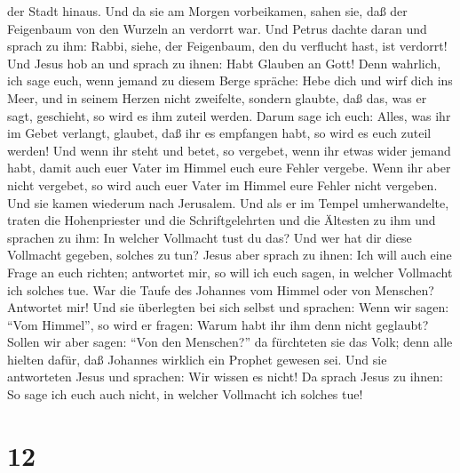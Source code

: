 der Stadt hinaus.  Und da sie am Morgen vorbeikamen,
sahen sie, daß der Feigenbaum von den Wurzeln an verdorrt war.
 Und Petrus dachte daran und sprach zu ihm: Rabbi, siehe,
der Feigenbaum, den du verflucht hast, ist verdorrt!  Und
Jesus hob an und sprach zu ihnen: Habt Glauben an Gott! 
Denn wahrlich, ich sage euch, wenn jemand zu diesem Berge spräche: Hebe
dich und wirf dich ins Meer, und in seinem Herzen nicht zweifelte,
sondern glaubte, daß das, was er sagt, geschieht, so wird es ihm zuteil
werden.  Darum sage ich euch: Alles, was ihr im Gebet
verlangt, glaubet, daß ihr es empfangen habt, so wird es euch zuteil
werden!  Und wenn ihr steht und betet, so vergebet, wenn
ihr etwas wider jemand habt, damit auch euer Vater im Himmel euch eure
Fehler vergebe.  Wenn ihr aber nicht vergebet, so wird
auch euer Vater im Himmel eure Fehler nicht vergeben. 
Und sie kamen wiederum nach Jerusalem. Und als er im Tempel
umherwandelte, traten die Hohenpriester und die Schriftgelehrten und die
Ältesten zu ihm  und sprachen zu ihm: In welcher
Vollmacht tust du das? Und wer hat dir diese Vollmacht gegeben, solches
zu tun?  Jesus aber sprach zu ihnen: Ich will auch eine
Frage an euch richten; antwortet mir, so will ich euch sagen, in welcher
Vollmacht ich solches tue.  War die Taufe des Johannes
vom Himmel oder von Menschen? Antwortet mir!  Und sie
überlegten bei sich selbst und sprachen: Wenn wir sagen: ``Vom Himmel'',
so wird er fragen: Warum habt ihr ihm denn nicht geglaubt?
 Sollen wir aber sagen: ``Von den Menschen?'' da
fürchteten sie das Volk; denn alle hielten dafür, daß Johannes wirklich
ein Prophet gewesen sei.  Und sie antworteten Jesus und
sprachen: Wir wissen es nicht! Da sprach Jesus zu ihnen: So sage ich
euch auch nicht, in welcher Vollmacht ich solches tue!

\hypertarget{section-11}{%
\section{12}\label{section-11}}

